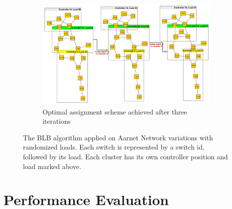 \documentclass{IEEEtran}
\begin{document}
\begin{figure}
\begin{subfigure}{0.9\textwidth}
			\includegraphics[width=\linewidth]{Images/Aarnet_Load_2.jpg}
			\caption{Optimal assignment scheme achieved after three iterations}
			\label{fig:aarnet2009l2}
		\end{subfigure}
		\caption{The BLB algorithm applied on Aarnet Network variations with randomized loads. Each switch is represented by a switch id, followed by its load. Each cluster has its own controller position and load marked above.}
	\end{figure}
	
	\twocolumn
	\section{Performance Evaluation}
	
\end{document}
